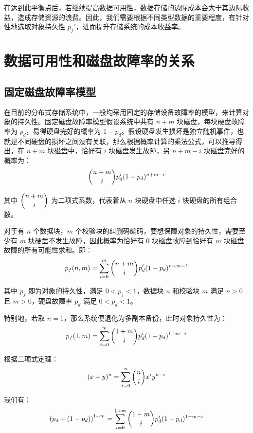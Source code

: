 在达到此平衡点后，若继续提高数据可用性，数据存储的边际成本会大于其边际收益，造成存储资源的浪费。因此，我们需要根据不同类型数据的重要程度，有针对性地选取对象持久性 $p_{f}'$，进而提升存储系统的成本收益率。
\section{数据可用性和磁盘故障率的关系}
\subsection{固定磁盘故障率模型}
在目前的分布式存储系统中，一般均采用固定的存储设备故障率的模型，来计算对象的持久性。固定磁盘故障率模型假设系统中共有 $n+m$ 块磁盘，每块硬盘故障率为 $p_d$，易得硬盘完好的概率为 $1-p_d$。假设硬盘发生损坏是独立随机事件，也就是不同硬盘的损坏之间没有关联，那么根据概率计算的乘法公式，可以推导得出，在 $n+m$ 块磁盘中，恰好有 $i$ 块磁盘发生故障，另 $n+m-i$ 块磁盘完好的概率为：
\begin{equation}
\dbinom{n+m}{i}p_{d}^{i}(1-p_d)^{n+m-i}
\end{equation}

其中 $\dbinom{n+m}{i}$ 为二项式系数，代表着从 $n$ 块硬盘中任选 $i$ 块硬盘的所有组合数。

对于有 $n$ 个数据块，$m$ 个校验块的纠删码编码，要想保障对象的持久性，需要至少有 $m$ 块硬盘不发生故障，因此概率为恰好有 $0$ 块磁盘故障到恰好有 $m$ 块磁盘故障的所有可能性求和。即：
\begin{equation}
p_{f}(n,m)=\sum_{i=0}^{m}{\dbinom{n+m}{i}p_{d}^{i}(1-p_d)^{n+m-i}}
\end{equation}

其中 $p_f$ 即为对象的持久性，满足 $0<p_f<1$，数据块 $n$ 和校验块 $m$ 满足 $n>0$ 且 $m>0$，硬盘故障率 $p_d$ 满足 $0<p_d<1$。

特别地，若取 $n=1$，那么系统便退化为多副本备份，此时对象持久性为：
\begin{equation}
p_{f}(1,m)=\sum_{i=0}^{m}{\dbinom{1+m}{i}p_{d}^{i}(1-p_d)^{1+m-i}}
\end{equation}

根据二项式定理：
\begin{equation}
(x+y)^n=\sum_{i=0}^{n}{\dbinom{n}{i}x^{i}y^{n-i}}
\end{equation}

我们有：
\begin{equation}
\left(p_d+(1-p_d)\right)^{1+m}=\sum_{i=0}^{1+m}{\dbinom{1+m}{i}p_{d}^{i}(1-p_d)^{1+m-i}}
\end{equation}

